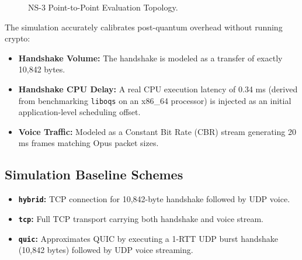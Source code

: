 \begin{figure}[htbp]
    \centering
    \caption{NS-3 Point-to-Point Evaluation Topology.}
    \label{fig:ns3_topology}
\end{figure}

The simulation accurately calibrates post-quantum overhead without running crypto:
\begin{itemize}
    \item \textbf{Handshake Volume:} The handshake is modeled as a transfer of exactly 10,842 bytes.
    \item \textbf{Handshake CPU Delay:} A real CPU execution latency of 0.34 ms (derived from benchmarking \texttt{liboqs} on an x86\_64 processor) is injected as an initial application-level scheduling offset.
    \item \textbf{Voice Traffic:} Modeled as a Constant Bit Rate (CBR) stream generating 20 ms frames matching Opus packet sizes.
\end{itemize}

\subsection{Simulation Baseline Schemes}
\begin{itemize}
    \item \textbf{\texttt{hybrid}:} TCP connection for 10,842-byte handshake followed by UDP voice.
    \item \textbf{\texttt{tcp}:} Full TCP transport carrying both handshake and voice stream.
    \item \textbf{\texttt{quic}:} Approximates QUIC by executing a 1-RTT UDP burst handshake (10,842 bytes) followed by UDP voice streaming.
\end{itemize}

